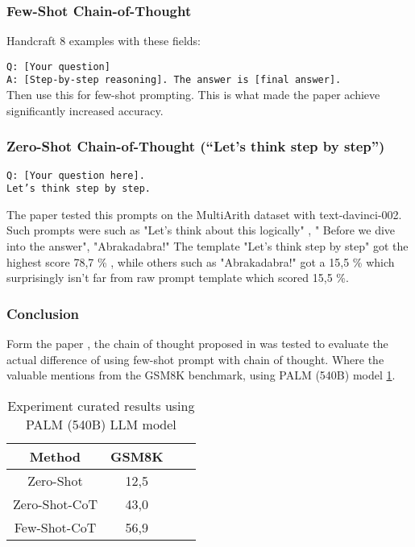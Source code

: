 \subsubsection{Few-Shot Chain-of-Thought \cite{chainofthought}}
Handcraft 8 examples with these fields:

\texttt{Q: [Your question]}\\
\texttt{A: [Step-by-step reasoning]. The answer is [final answer].}\\
Then use this for few-shot prompting. This is what made the paper achieve significantly increased accuracy.

\subsubsection{Zero-Shot Chain-of-Thought (“Let’s think step by step”) \cite{chainofzero}}
\texttt{Q: [Your question here].}\\
\texttt{Let’s think step by step.}

The paper \cite{chainofzero} tested this prompts on the MultiArith dataset with text-davinci-002. Such prompts were such as "Let’s think about this logically" , " Before we dive into the answer", "Abrakadabra!"
The template "Let's think step by step" got the highest score 78,7 \% , while others such as "Abrakadabra!" got a 15,5 \% which surprisingly isn't far from raw prompt template which scored 15,5 \%.

\subsubsection{Conclusion}
Form the paper \cite{chainofzero}, the chain of thought proposed in \cite{chainofthought} was tested to evaluate the actual difference of using few-shot prompt with chain of thought.
Where the valuable mentions from the GSM8K benchmark, using PALM (540B) model \ref{tab:chainofzero}.

\begin{table}[h!]
    \centering
    \begin{tabular}{|c|c|cc}
        \hline
        Method & GSM8K\\
        \hline
        Zero-Shot & 12,5 \\
        \hline
        Zero-Shot-CoT \cite{chainofzero} & 43,0 \\
        \hline
        Few-Shot-CoT \cite{chainofthought} & 56,9 \\
        \hline
    \end{tabular}
    \caption{Experiment curated results using PALM (540B) \gls{LLM} model \cite{chainofzero}}
    \label{tab:chainofzero}
\end{table}

